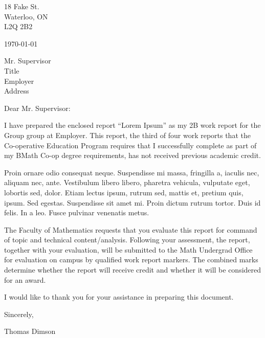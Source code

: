 \documentclass[12pt]{article}
\begin{document}



\begin{waterlooletter}
18 Fake St.\\
Waterloo, ON\\
L2Q 2B2

\today

Mr. Supervisor\\
Title\\
Employer\\
Address

Dear Mr. Supervisor:

I have prepared the enclosed report ``Lorem Ipsum'' as my 2B work report for the Group group at Employer. This report, the third of four work reports that the Co-operative Education Program requires that I successfully complete as part of my BMath Co-op degree requirements, has not received previous academic credit.

Proin ornare odio consequat neque. Suspendisse mi massa, fringilla a, iaculis nec, aliquam nec, ante. Vestibulum libero libero, pharetra vehicula, vulputate eget, lobortis sed, dolor. Etiam lectus ipsum, rutrum sed, mattis et, pretium quis, ipsum. Sed egestas. Suspendisse sit amet mi. Proin dictum rutrum tortor. Duis id felis. In a leo. Fusce pulvinar venenatis metus.

The Faculty of Mathematics requests that you evaluate this report for command of topic and technical content/analysis. Following your assessment, the report, together with your evaluation, will be submitted to the Math Undergrad Office for evaluation on campus by qualified work report markers. The combined marks determine whether the report will receive credit and whether it will be considered for an award.

I would like to thank you for your assistance in preparing this document.

Sincerely,\\

\vspace{1.5em}

Thomas Dimson
\end{waterlooletter}
\end{document}
